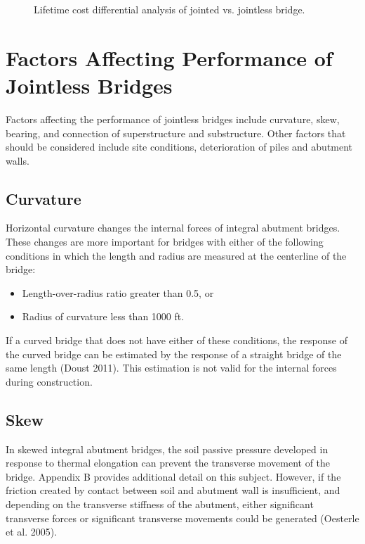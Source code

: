 \begin{figure}
  \caption{Lifetime cost differential analysis of jointed vs. jointless bridge.}\label{fig:life-cost-differential}
\end{figure}

\section{Factors Affecting Performance of Jointless Bridges}
Factors affecting the performance of jointless bridges include curvature, skew, bearing, and connection of superstructure and substructure. Other factors that should be considered include site conditions, deterioration of piles and abutment walls.


\subsection{Curvature}
Horizontal curvature changes the internal forces of integral abutment bridges. These changes are more important
for bridges with either of the following conditions in which the length and radius are measured at the centerline of the
bridge:

\begin{itemize}
  \item Length-over-radius ratio greater than 0.5, or
  \item Radius of curvature less than 1000 ft.
\end{itemize}

If a curved bridge that does not have either of these conditions, the response of the curved bridge can be estimated by the response of a straight bridge of the same length (Doust 2011). This estimation is not valid for the internal
forces during construction.

\subsection{Skew}

In skewed integral abutment bridges, the soil passive pressure developed in response to thermal elongation can
prevent the transverse movement of the bridge. Appendix B provides additional detail on this subject. However, if the
friction created by contact between soil and abutment wall is insufficient, and depending on the transverse stiffness of the abutment, either significant transverse forces or significant transverse movements could be generated (Oesterle et al. 2005).


